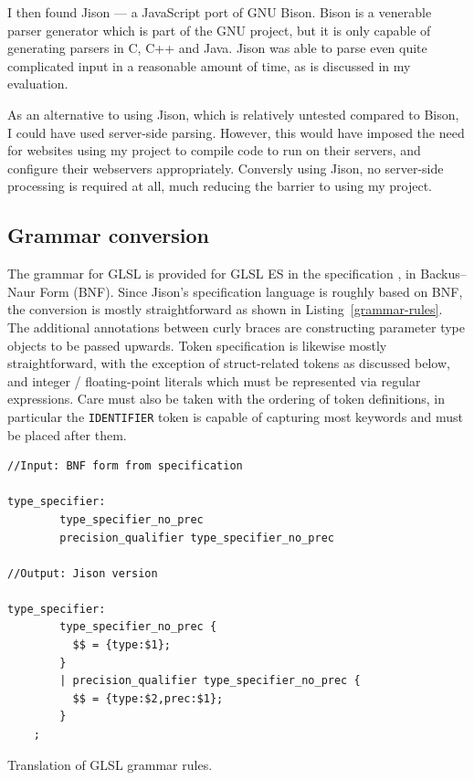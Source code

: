 \documentclass[12pt,twoside,notitlepage]{report}
\begin{document}
I then found Jison \citet{jison} --- a JavaScript port of GNU Bison. Bison is a venerable parser generator which is part of the GNU project, but it is only capable of generating parsers in C, C++ and Java.  Jison was able to parse even quite complicated input in a reasonable amount of time, as is discussed in my evaluation. 

As an alternative to using Jison, which is relatively untested compared to Bison, I could have used server-side parsing. However, this would have imposed the need for websites using my project to compile code to run on their servers, and configure their webservers appropriately. Conversly using Jison, no server-side processing is required at all, much reducing the barrier to using my project.

\subsection{Grammar conversion}
The grammar for GLSL is provided for GLSL ES in the specification \citet{glsl-spec}, in Backus–Naur Form (BNF). Since Jison's specification language is roughly based on BNF, the conversion is mostly straightforward as shown in Listing~\ref{grammar-rules}. The additional annotations between curly braces are constructing parameter type objects to be passed upwards. Token specification is likewise mostly straightforward, with the exception of struct-related tokens as discussed below, and integer / floating-point literals which must be represented via regular expressions. Care must also be taken with the ordering of token definitions, in particular the \texttt{IDENTIFIER} token is capable of capturing most keywords and must be placed after them.
\begin{listing}
\begin{verbatim}
//Input: BNF form from specification

type_specifier:
        type_specifier_no_prec
        precision_qualifier type_specifier_no_prec

//Output: Jison version

type_specifier:
        type_specifier_no_prec { 
          $$ = {type:$1}; 
        }
        | precision_qualifier type_specifier_no_prec { 
          $$ = {type:$2,prec:$1}; 
        }
	;
\end{verbatim}
\caption{Translation of GLSL grammar rules.\label{grammar-rules}}
\end{listing}
\end{document}
